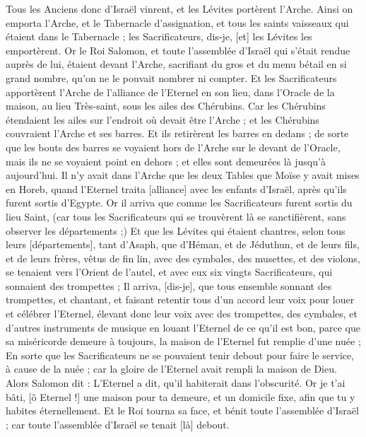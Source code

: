 \begin{multicols}{2}
Tous les Anciens donc d'Israël vinrent, et les Lévites portèrent l'Arche.
Ainsi on emporta l'Arche, et le Tabernacle d'assignation, et tous les saints vaisseaux qui étaient dans le Tabernacle ; les Sacrificateurs, dis-je, [et] les Lévites les emportèrent.
Or le Roi Salomon, et toute l'assemblée d'Israël qui s'était rendue auprès de lui, étaient devant l'Arche, sacrifiant du gros et du menu bétail en si grand nombre, qu'on ne le pouvait nombrer ni compter.
Et les Sacrificateurs apportèrent l'Arche de l'alliance de l'Eternel en son lieu, dans l'Oracle de la maison, au lieu Très-saint, sous les ailes des Chérubins.
Car les Chérubins étendaient les ailes sur l'endroit où devait être l'Arche ; et les Chérubins couvraient l'Arche et ses barres.
Et ils retirèrent les barres en dedans ; de sorte que les bouts des barres se voyaient hors de l'Arche sur le devant de l'Oracle, mais ils ne se voyaient point en dehors ; et elles sont demeurées là jusqu'à aujourd'hui.
Il n'y avait dans l'Arche que les deux Tables que Moïse y avait mises en Horeb, quand l'Eternel traita [alliance] avec les enfants d'Israël, après qu'ils furent sortis d'Egypte.
Or il arriva que comme les Sacrificateurs furent sortis du lieu Saint, (car tous les Sacrificateurs qui se trouvèrent là se sanctifièrent, sans observer les départements ;)
Et que les Lévites qui étaient chantres, selon tous leurs [départements], tant d'Asaph, que d'Héman, et de Jéduthun, et de leurs fils, et de leurs frères, vêtus de fin lin, avec des cymbales, des musettes, et des violons, se tenaient vers l'Orient de l'autel, et avec eux six vingts Sacrificateurs, qui sonnaient des trompettes ;
Il arriva, [dis-je], que tous ensemble sonnant des trompettes, et chantant, et faisant retentir tous d'un accord leur voix pour louer et célébrer l'Eternel, élevant donc leur voix avec des trompettes, des cymbales, et d'autres instruments de musique en louant l'Eternel de ce qu'il est bon, parce que sa miséricorde demeure à toujours, la maison de l'Eternel fut remplie d'une nuée ;
En sorte que les Sacrificateurs ne se pouvaient tenir debout pour faire le service, à cause de la nuée ; car la gloire de l'Eternel avait rempli la maison de Dieu.
\VerseOne{}Alors Salomon dit : L'Eternel a dit, qu'il habiterait dans l'obscurité.
Or je t'ai bâti, [ô Eternel !] une maison pour ta demeure, et un domicile fixe, afin que tu y habites éternellement.
Et le Roi tourna sa face, et bénit toute l'assemblée d'Israël ; car toute l'assemblée d'Israël se tenait [là] debout.

\end{multicols}
